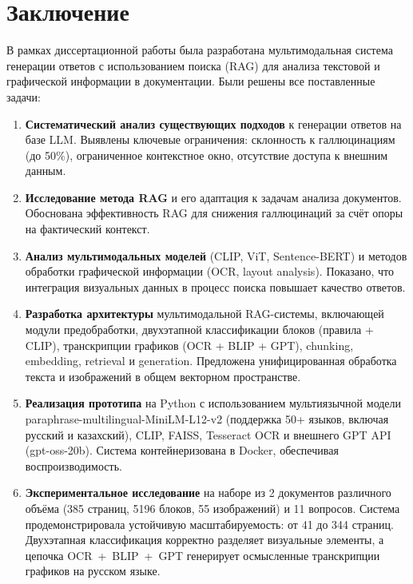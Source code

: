 \documentclass[a4paper,12pt]{article}
\begin{document}
\newpage

\section*{Заключение}

В рамках диссертационной работы была разработана мультимодальная система генерации ответов с использованием поиска (RAG) для анализа текстовой и графической информации в документации. Были решены все поставленные задачи:

\begin{enumerate}
    \item \textbf{Систематический анализ существующих подходов} к генерации ответов на базе LLM. Выявлены ключевые ограничения: склонность к галлюцинациям (до 50\%), ограниченное контекстное окно, отсутствие доступа к внешним данным.

    \item \textbf{Исследование метода RAG} и его адаптация к задачам анализа документов. Обоснована эффективность RAG для снижения галлюцинаций за счёт опоры на фактический контекст.

    \item \textbf{Анализ мультимодальных моделей} (CLIP, ViT, Sentence-BERT) и методов обработки графической информации (OCR, layout analysis). Показано, что интеграция визуальных данных в процесс поиска повышает качество ответов.

    \item \textbf{Разработка архитектуры} мультимодальной RAG-системы, включающей модули предобработки, двухэтапной классификации блоков (правила + CLIP), транскрипции графиков (OCR + BLIP + GPT), chunking, embedding, retrieval и generation. Предложена унифицированная обработка текста и изображений в общем векторном пространстве.

    \item \textbf{Реализация прототипа} на Python с использованием мультиязычной модели paraphrase-multilingual-MiniLM-L12-v2 (поддержка 50+ языков, включая русский и казахский), CLIP, FAISS, Tesseract OCR и внешнего GPT API (gpt-oss-20b). Система контейнеризована в Docker, обеспечивая воспроизводимость.

    \item \textbf{Экспериментальное исследование} на наборе из 2 документов различного объёма (385 страниц, 5196 блоков, 55 изображений) и 11 вопросов. Система продемонстрировала устойчивую масштабируемость: от 41 до 344 страниц. Двухэтапная классификация корректно разделяет визуальные элементы, а цепочка OCR~+~BLIP~+~GPT генерирует осмысленные транскрипции графиков на русском языке.
\end{enumerate}
\end{document}
